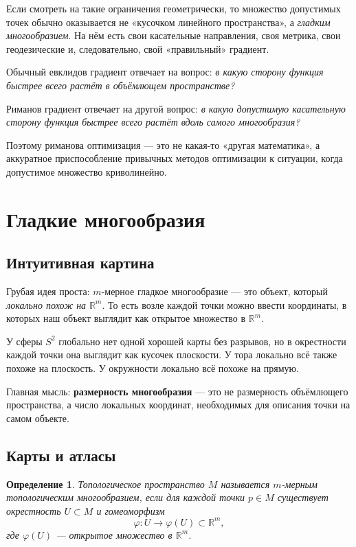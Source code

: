\documentclass[12pt,a4paper]{article}
\theoremstyle{rudef}
\newtheorem{definition}{Определение}[section]
\theoremstyle{ruplain}
\newcommand{\R}{\mathbb{R}}
\begin{document}
Если смотреть на такие ограничения геометрически, то множество допустимых точек обычно оказывается не «кусочком линейного пространства», а \emph{гладким многообразием}. На нём есть свои касательные направления, своя метрика, свои геодезические и, следовательно, свой «правильный» градиент.

\begin{ideabox}
Обычный евклидов градиент отвечает на вопрос: \emph{в какую сторону функция быстрее всего растёт в объёмлющем пространстве?}

Риманов градиент отвечает на другой вопрос: \emph{в какую допустимую касательную сторону функция быстрее всего растёт вдоль самого многообразия?}
\end{ideabox}

Поэтому риманова оптимизация --- это не какая-то «другая математика», а аккуратное приспособление привычных методов оптимизации к ситуации, когда допустимое множество криволинейно.

\section{Гладкие многообразия}

\subsection{Интуитивная картина}

Грубая идея проста: $m$-мерное гладкое многообразие --- это объект, который \emph{локально похож на $\R^m$}. То есть возле каждой точки можно ввести координаты, в которых наш объект выглядит как открытое множество в $\R^m$.

У сферы $S^2$ глобально нет одной хорошей карты без разрывов, но в окрестности каждой точки она выглядит как кусочек плоскости. У тора локально всё также похоже на плоскость. У окружности локально всё похоже на прямую.

Главная мысль: \textbf{размерность многообразия} --- это не размерность объёмлющего пространства, а число локальных координат, необходимых для описания точки на самом объекте.

\subsection{Карты и атласы}

\begin{definition}
Топологическое пространство $M$ называется $m$-мерным \emph{топологическим многообразием}, если для каждой точки $p\in M$ существует окрестность $U\subset M$ и гомеоморфизм
\[
\varphi:U\to \varphi(U)\subset \R^m,
\]
где $\varphi(U)$ --- открытое множество в $\R^m$.
\end{definition}
\end{document}
